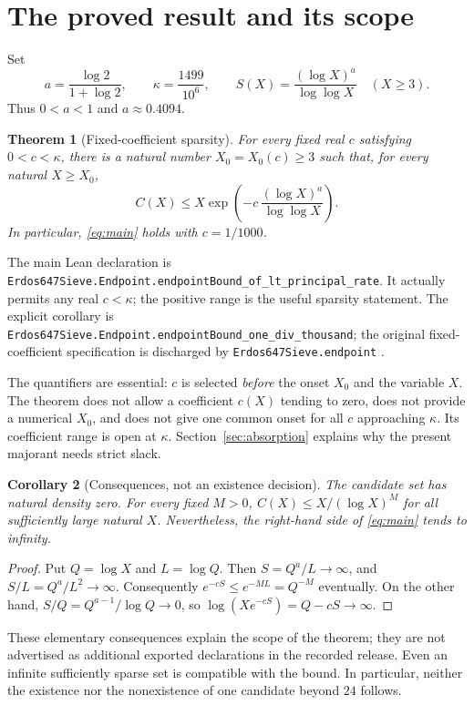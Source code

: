 \documentclass[11pt,a4paper]{article}
\newtheorem{theorem}{Theorem}[section]
\newtheorem{corollary}[theorem]{Corollary}
\theoremstyle{definition}
\theoremstyle{remark}
\numberwithin{equation}{section}
\newcommand{\rate}{\kappa}
\newcommand{\leanname}[1]{{\small\nolinkurl{#1}}}
\begin{document}
\section{The proved result and its scope}\label{sec:result}
Set
\begin{equation}\label{eq:constants}
 a=\frac{\log2}{1+\log2},\qquad
 \rate=\frac{1499}{10^6},\qquad
 S(X)=\frac{(\log X)^a}{\log\log X}\quad(X\ge3).
\end{equation}
Thus $0<a<1$ and $a\approx0.4094$.

\begin{theorem}[Fixed-coefficient sparsity]\label{thm:main}
For every fixed real $c$ satisfying $0<c<\rate$, there is a natural number
$X_0=X_0(c)\ge3$ such that, for every natural $X\ge X_0$,
\begin{equation}\label{eq:main}
 \boxed{C(X)\le X\exp\!\left(-c\,\frac{(\log X)^a}{\log\log X}\right).}
\end{equation}
In particular, \eqref{eq:main} holds with $c=1/1000$.
\end{theorem}
The main Lean declaration is
\leanname{Erdos647Sieve.Endpoint.endpointBound_of_lt_principal_rate}.
It actually permits any real $c<\rate$; the positive range is the useful
sparsity statement. The explicit corollary is
\leanname{Erdos647Sieve.Endpoint.endpointBound_one_div_thousand};
the original fixed-coefficient specification is discharged by
\leanname{Erdos647Sieve.endpoint} \citep{SieveArtifact}.

The quantifiers are essential: $c$ is selected \emph{before} the onset $X_0$
and the variable $X$. The theorem does not allow a coefficient $c(X)$ tending
to zero, does not provide a numerical $X_0$, and does not give one common onset
for all $c$ approaching $\rate$. Its coefficient range is open at $\rate$.
Section~\ref{sec:absorption} explains why the present majorant needs strict
slack.

\begin{corollary}[Consequences, not an existence decision]\label{cor:density}
The candidate set has natural density zero. For every fixed $M>0$,
$C(X)\le X/(\log X)^M$ for all sufficiently large natural $X$.
Nevertheless, the right-hand side of \eqref{eq:main} tends to infinity.
\end{corollary}
\begin{proof}
Put $Q=\log X$ and $L=\log Q$. Then $S=Q^a/L\to\infty$, and
$S/L=Q^a/L^2\to\infty$. Consequently $e^{-cS}\le e^{-ML}=Q^{-M}$
eventually. On the other hand, $S/Q=Q^{a-1}/\log Q\to0$, so
$\log(Xe^{-cS})=Q-cS\to\infty$.
\end{proof}
These elementary consequences explain the scope of the theorem; they are not
advertised as additional exported declarations in the recorded release.
Even an infinite sufficiently sparse set is compatible with the bound. In
particular, neither the existence nor the nonexistence of one candidate beyond
$24$ follows.
\end{document}
